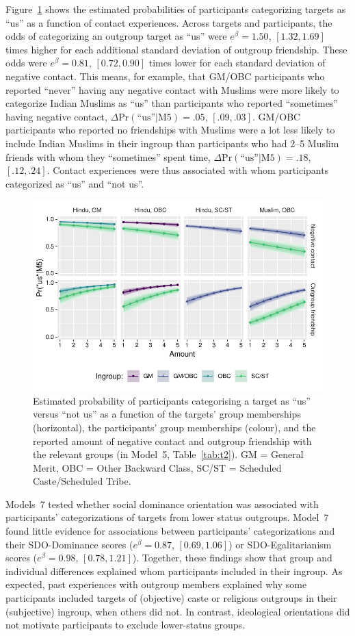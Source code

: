 \documentclass[12pt, a4paper]{article}
\newcommand{\pdif}[4]{$ \Delta\text{Pr} (\text{``us''} | \text{#1}) = #2$, $[#3, #4]$}
\begin{document}
Figure~\ref{fig:f4} shows the estimated probabilities of participants categorizing targets as ``us'' as a function of contact experiences. Across targets and participants, the odds of categorizing an outgroup target as ``us'' were $e^\beta = 1.50$, $[1.32, 1.69]$ times higher for each additional standard deviation of outgroup friendship. These odds were $e^\beta = 0.81$, $[0.72, 0.90]$ times lower for each standard deviation of negative contact. This means, for example, that GM/OBC participants who reported ``never'' having any negative contact with Muslims were more likely to categorize Indian Muslims as ``us'' than participants who reported ``sometimes'' having negative contact, \pdif{M5}{.05}{.09}{.03}. GM/OBC participants who reported no friendships with Muslims were a lot less likely to include Indian Muslims in their ingroup than participants who had 2--5 Muslim friends with whom they ``sometimes'' spent time, \pdif{M5}{.18}{.12}{.24}. Contact experiences were thus associated with whom participants categorized as ``us'' and ``not us''.

\begin{figure}
\centering
\includegraphics[scale=1]{../figures/figure-4}
\caption{Estimated probability of participants categorising a target as ``us'' versus ``not us'' as a function of the targets' group memberships (horizontal), the participants' group memberships (colour), and the reported amount of negative contact and outgroup friendship with the relevant groups (in Model~5, Table~\ref{tab:t2}). GM = General Merit, OBC = Other Backward Class, SC/ST = Scheduled Caste/Scheduled Tribe.}
\label{fig:f4}
\end{figure}

Models~7 tested whether social dominance orientation was associated with participants' categorizations of targets from lower status outgroups. Model~7 found little evidence for associations between participants' categorizations and their SDO-Dominance scores ($e^\beta = 0.87$, $[0.69, 1.06]$) or SDO-Egalitarianism scores ($e^\beta = 0.98$, $[0.78, 1.21]$). Together, these findings show that group and individual differences explained whom participants included in their ingroup. As expected, past experiences with outgroup members explained why some participants included targets of (objective) caste or religions outgroups in their (subjective) ingroup, when others did not. In contrast, ideological orientations did not motivate participants to exclude lower-status groups.
\end{document}
